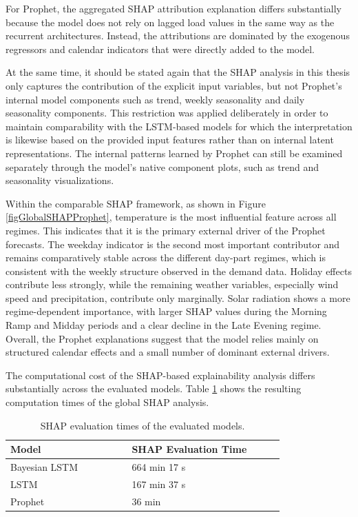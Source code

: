 \documentclass[Master,english,IEEE]{twbook}
\begin{document}
For Prophet, the aggregated SHAP attribution explanation differs substantially because the model does not rely on lagged load values in the same way as the recurrent architectures. Instead, the attributions are dominated by the exogenous regressors and calendar indicators that were directly added to the model. 

At the same time, it should be stated again that the SHAP analysis in this thesis only captures the contribution of the explicit input variables, but not Prophet's internal model components such as trend, weekly seasonality and daily seasonality components. This restriction was applied deliberately in order to maintain comparability with the LSTM-based models for which the interpretation is likewise based on the provided input features rather than on internal latent representations. The internal patterns learned by Prophet can still be examined separately through the model's native component plots, such as trend and seasonality visualizations.

Within the comparable SHAP framework, as shown in Figure \ref{figGlobalSHAPProphet}, temperature is the most influential feature across all regimes. This indicates that it is the primary external driver of the Prophet forecasts. The weekday indicator is the second most important contributor and remains comparatively stable across the different day-part regimes, which is consistent with the weekly structure observed in the demand data. Holiday effects contribute less strongly, while the remaining weather variables, especially wind speed and precipitation, contribute only marginally. Solar radiation shows a more regime-dependent importance, with larger SHAP values during the Morning Ramp and Midday periods and a clear decline in the Late Evening regime. Overall, the Prophet explanations suggest that the model relies mainly on structured calendar effects and a small number of dominant external drivers.

The computational cost of the SHAP-based explainability analysis differs substantially across the evaluated models. Table \ref{tabShapTimes} shows the resulting computation times of the global SHAP analysis.


\begin{table}[!htbp]
\centering
\caption{SHAP evaluation times of the evaluated models.}\label{tabShapTimes}
\begin{tabular}{| p{0.35\linewidth} | p{0.44\linewidth} |}\hline
Model & SHAP Evaluation Time\\\hline
Bayesian LSTM & 664 min 17 s\\
LSTM & 167 min 37 s\\
Prophet & 36 min\\\hline
\end{tabular}
\end{table}
\end{document}
